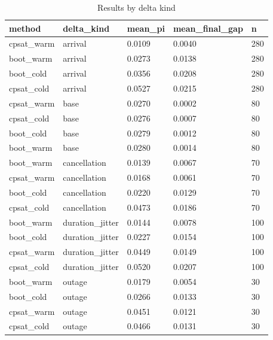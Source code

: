\begin{table}[t]
\centering
\begin{tabular}{lllll}
\toprule
method & delta\_kind & mean\_pi & mean\_final\_gap & n \\
\midrule
cpsat\_warm & arrival & 0.0109 & 0.0040 & 280 \\
boot\_warm & arrival & 0.0273 & 0.0138 & 280 \\
boot\_cold & arrival & 0.0356 & 0.0208 & 280 \\
cpsat\_cold & arrival & 0.0527 & 0.0215 & 280 \\
cpsat\_warm & base & 0.0270 & 0.0002 & 80 \\
cpsat\_cold & base & 0.0276 & 0.0007 & 80 \\
boot\_cold & base & 0.0279 & 0.0012 & 80 \\
boot\_warm & base & 0.0280 & 0.0014 & 80 \\
boot\_warm & cancellation & 0.0139 & 0.0067 & 70 \\
cpsat\_warm & cancellation & 0.0168 & 0.0061 & 70 \\
boot\_cold & cancellation & 0.0220 & 0.0129 & 70 \\
cpsat\_cold & cancellation & 0.0473 & 0.0186 & 70 \\
boot\_warm & duration\_jitter & 0.0144 & 0.0078 & 100 \\
boot\_cold & duration\_jitter & 0.0227 & 0.0154 & 100 \\
cpsat\_warm & duration\_jitter & 0.0449 & 0.0149 & 100 \\
cpsat\_cold & duration\_jitter & 0.0520 & 0.0207 & 100 \\
boot\_warm & outage & 0.0179 & 0.0054 & 30 \\
boot\_cold & outage & 0.0266 & 0.0133 & 30 \\
cpsat\_warm & outage & 0.0451 & 0.0121 & 30 \\
cpsat\_cold & outage & 0.0466 & 0.0131 & 30 \\
\bottomrule
\end{tabular}
\caption{Results by delta kind}
\label{tab:by-delta}
\end{table}
